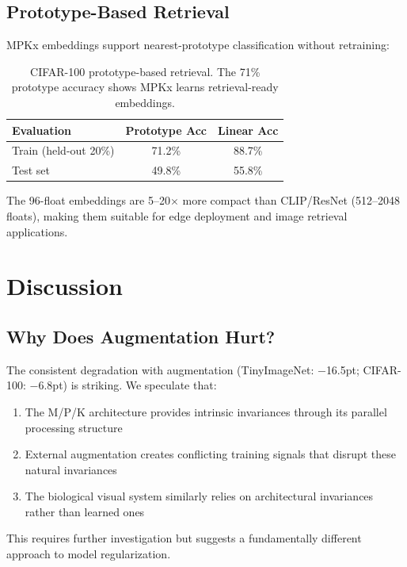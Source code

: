 \documentclass[11pt]{article}
\begin{document}
\subsection{Prototype-Based Retrieval}

MPKx embeddings support nearest-prototype classification without retraining:

\begin{table}[h]
\centering
\begin{tabular}{lcc}
\toprule
\textbf{Evaluation} & \textbf{Prototype Acc} & \textbf{Linear Acc} \\
\midrule
Train (held-out 20\%) & 71.2\% & 88.7\% \\
Test set & 49.8\% & 55.8\% \\
\bottomrule
\end{tabular}
\caption{CIFAR-100 prototype-based retrieval. The 71\% prototype accuracy shows MPKx learns retrieval-ready embeddings.}
\end{table}

The 96-float embeddings are 5--20$\times$ more compact than CLIP/ResNet (512--2048 floats), making them suitable for edge deployment and image retrieval applications.

\section{Discussion}

\subsection{Why Does Augmentation Hurt?}

The consistent degradation with augmentation (TinyImageNet: $-$16.5pt; CIFAR-100: $-$6.8pt) is striking. We speculate that:

\begin{enumerate}
    \item The M/P/K architecture provides intrinsic invariances through its parallel processing structure
    \item External augmentation creates conflicting training signals that disrupt these natural invariances
    \item The biological visual system similarly relies on architectural invariances rather than learned ones
\end{enumerate}

This requires further investigation but suggests a fundamentally different approach to model regularization.
\end{document}

